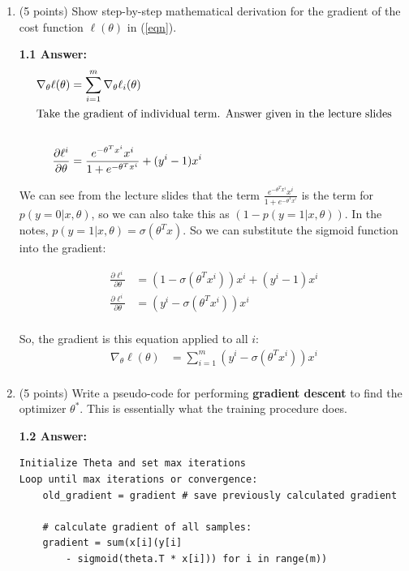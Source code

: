 \documentclass[12pt]{article}
\begin{document}
\begin{enumerate}
\item (5 points) Show step-by-step mathematical derivation for the gradient of the cost function $\ell(\theta)$ in (\ref{eqn}).

{\bf 1.1 Answer:}
\begin{align*}
    \nabla_\theta \ell(\theta) &= \sum_{i=1}^m\nabla_\theta \ell_i(\theta) \\
    \intertext{Take the gradient of individual term. Answer given in the lecture slides} \\
    \frac {\partial \ell^i}{\partial \theta}  &= \frac{e^{-\theta^T x^i}x^i}{1+e^{-\theta^T x^i}} + (y^i -1)x^i \\
\end{align*}

We can see from the lecture slides that the term $\frac{e^{-\theta^T x^i}x^i}{1+e^{-\theta^T x^i}}$ is the term for $p(y=0|x,\theta)$, so we can also take this as $(1-p(y=1|x,\theta))$. In the notes, $p(y=1|x,\theta) = \sigma(\theta^Tx)$. So we can substitute the sigmoid function into the gradient:

\begin{align*}
    \frac {\partial \ell^i}{\partial \theta}  &= (1-\sigma(\theta^T x^i))x^i + (y^i -1)x^i \\
    \frac {\partial \ell^i}{\partial \theta}  &= (y^i -\sigma(\theta^T x^i))x^i \\
\end{align*}

So, the gradient is this equation applied to all $i$:
\begin{align*}
    \nabla_\theta \ell(\theta) &= \sum_{i=1}^m(y^i -\sigma(\theta^T x^i))x^i \\
\end{align*}

\item (5 points) Write a pseudo-code  for performing {\bf gradient descent} to find the optimizer $\theta^*$. This is essentially what the training procedure does.

{\bf 1.2 Answer:}

\begin{lstlisting}
Initialize Theta and set max iterations
Loop until max iterations or convergence:
    old_gradient = gradient # save previously calculated gradient
    
    # calculate gradient of all samples:
    gradient = sum(x[i](y[i] 
        - sigmoid(theta.T * x[i])) for i in range(m))


\end{lstlisting}
\end{enumerate}
\end{document}
